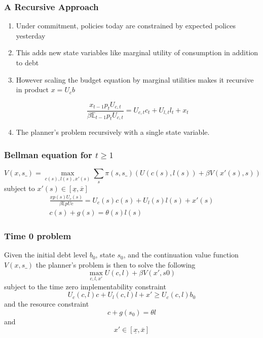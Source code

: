 \documentclass{beamer}
\newcommand{\EE}{\mathbb E}
\begin{document}
 \begin{frame}
	\frametitle{A Recursive Approach}
	
	\begin{enumerate}
	 \item Under commitment, policies today are constrained by expected polices yesterday
	 \item This adds new state variables like marginal utility of consumption in addition to debt
	 \item However scaling the budget equation by marginal utilities makes it recursive in product $x=U_c b$ 
	
	\[
		\frac{x_{t-1} p_t U_{c,t}}{\beta \EE_{t-1} p_t U_{c,t}}  = U_{c,t}c_t+U_{l,t} l_t + x_t
	\]
	
	\item The planner's problem recursively with a single state variable.  
	\end{enumerate}
	
	
	\end{frame}
	\begin{frame}
	\frametitle{Bellman equation for $t\geq1$}
	\[
		V(x,s\_) = \max_{c(s),l(s),x'(s)} \sum_s \pi(s,s\_)\left(U(c(s),l(s)) + \beta V(x'(s),s)\right)
	\]subject to $x'(s)\in [\underline x,\overline x]$
	\begin{align*}
		\frac{x p(s) U_c(s)}{\beta\EE pUc} =U_c(s)c(s)+U_l(s)l(s) + x'(s)\\
		c(s) + g(s) = \theta(s)l(s)
	\end{align*}  
	
 \end{frame}
\begin{frame}
	\frametitle{Time 0 problem}
	Given the initial debt level $b_0$, state $s_0$,  and the continuation value function $V(x,s\_)$ the planner's problem is then to solve the following
	\[
		\max_{c,l,x'} U(c,l) +\beta V(x',s0)
	\]subject to the time zero implementability constraint
	\[
		U_{c}(c,l)c + U_l(c,l) l + x' \geq U_c(c,l) b_0
	\]and the resource constraint
	\[
		c+ g(s_0) = \theta l
	\]and
	\[
		x' \in [\underline x,\overline x]
	\]
\end{frame}
\end{document}
